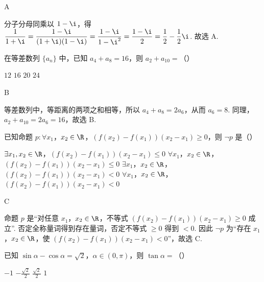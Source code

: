 \begin{answer}
A
\end{answer}

\begin{solution}
分子分母同乘以 \(1-\i\)，得 \(\displaystyle\frac{1}{1+\i}=\frac{1-\i}{(1+\i)(1-\i)}=\frac{1-\i}{1-\i^{2}}=\frac{1-\i}{2}=\frac{1}{2}-\frac{1}{2}\i\). 故选 A.
\end{solution}

\begin{problem}
在等差数列 \(\{a_{n}\}\) 中，已知 \(a_{4} + a_{8} = 16\)，则 \(a_{2} + a_{10} =\)（\quad）

\choices
    {\(12\)}
    {\(16\)}
    {\(20\)}
    {\(24\)}
\end{problem}

\begin{answer}
B
\end{answer}

\begin{solution}
等差数列中，等距离的两项之和相等，所以 \(a_4+a_8=2a_6\)，从而 \(a_6=8\). 同理，\(a_2+a_{10}=2a_6=16\)，故选 B.
\end{solution}

\begin{problem}
已知命题 \(p: \forall x_1\)，\(x_2 \in \R\)，\((f(x_2) - f(x_1))(x_2 - x_1) \geqslant 0\)，则 \(\neg p\) 是（\quad）

\choices
    {\(\exists x_{1},x_{2} \in \R\)，\((f(x_{2}) - f(x_{1}))(x_{2} - x_{1}) \leqslant 0\)}
    {\(\forall x_{1}\)，\(x_{2} \in \R\)，\((f(x_{2}) - f(x_{1}))(x_{2} - x_{1}) \leqslant 0\)}
    {\(\exists x_{1}\)，\(x_{2} \in \R\)，\((f(x_{2}) - f(x_{1}))(x_{2} - x_{1}) < 0\)}
    {\(\forall x_{1}\)，\(x_{2} \in \R\)，\((f(x_{2}) - f(x_{1}))(x_{2} - x_{1}) < 0\)}
\end{problem}

\begin{answer}
C
\end{answer}

\begin{solution}
命题 \(p\) 是“对任意 \(x_1\)，\(x_2\in\R\)，不等式 \((f(x_2)-f(x_1))(x_2-x_1)\geqslant0\) 成立”. 否定全称量词得到存在量词，否定不等式 \(\geqslant0\) 得到 \(<0\). 因此 \(\neg p\) 为“存在 \(x_1\)，\(x_2\in\R\)，使 \((f(x_2)-f(x_1))(x_2-x_1)<0\)”，故选 C.
\end{solution}

\begin{problem}
已知 \(\sin \alpha - \cos \alpha = \sqrt{2}\)，\(\alpha \in (0, \pi)\)，则 \(\tan \alpha =\)（\quad）

\choices
    {\(-1\)}
    {\( -\frac{\sqrt{2}}{2} \)}
    {\(\frac{\sqrt{2}}{2}\)}
    {\(1\)}
\end{problem}

